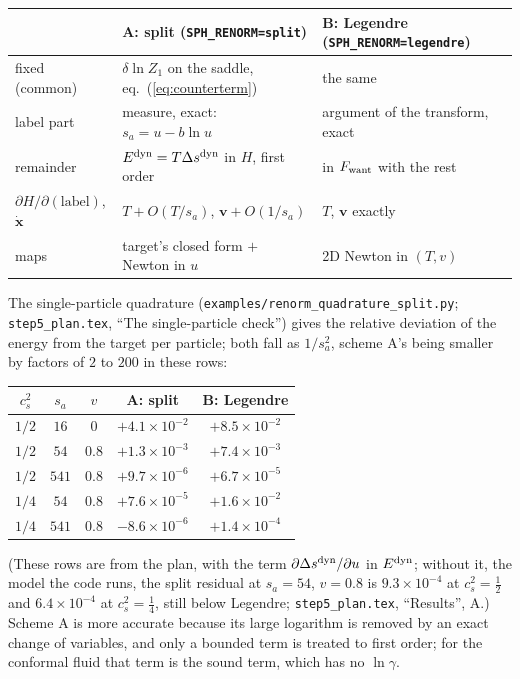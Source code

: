 \documentclass[11pt,aps,preprint,nofootinbib,superscriptaddress,tightenlines]{revtex4-2}
\def\Eq#1{eq.~(\ref{#1})}
\begin{document}
\begin{center}
\small
\begin{tabular}{lll}
\toprule
 & A: split (\texttt{SPH\_RENORM=split}) & B: Legendre (\texttt{SPH\_RENORM=legendre}) \\
\midrule
fixed (common) & $\delta\ln Z_1$ on the saddle, \Eq{eq:counterterm} & the same \\
label part & measure, exact: $s_a=u-b\ln u$ & argument of the transform, exact \\
remainder & $E^{\rm dyn}=T\Delta s^{\rm dyn}$ in $H$, first order & in $F_{\rm want}$ with the rest \\
$\partial H/\partial(\text{label})$, $\dot{\bm x}$ & $T+O(T/s_a)$, $\bm v+O(1/s_a)$ & $T$, $\bm v$ exactly \\
maps & target's closed form $+$ Newton in $u$ & 2D Newton in $(T,v)$ \\
\bottomrule
\end{tabular}
\end{center}
The single-particle quadrature (\nolinkurl{examples/renorm_quadrature_split.py}; \nolinkurl{step5_plan.tex}, ``The single-particle check'') gives the
relative deviation of the energy from the target per particle; both fall as $1/s_a^2$, scheme A's being smaller by factors of $2$ to $200$ in these rows:
\begin{center}
\small
\begin{tabular}{ccc cc}
\toprule
$c_s^2$ & $s_a$ & $v$ & A: split & B: Legendre \\
\midrule
$1/2$ & $16$ & $0$ & $+4.1\times10^{-2}$ & $+8.5\times10^{-2}$ \\
$1/2$ & $54$ & $0.8$ & $+1.3\times10^{-3}$ & $+7.4\times10^{-3}$ \\
$1/2$ & $541$ & $0.8$ & $+9.7\times10^{-6}$ & $+6.7\times10^{-5}$ \\
$1/4$ & $54$ & $0.8$ & $+7.6\times10^{-5}$ & $+1.6\times10^{-2}$ \\
$1/4$ & $541$ & $0.8$ & $-8.6\times10^{-6}$ & $+1.4\times10^{-4}$ \\
\bottomrule
\end{tabular}
\end{center}
(These rows are from the plan, with the term $\partial\Delta s^{\rm dyn}/\partial u$ in $E^{\rm dyn}$; without it, the model the code runs, the split residual
at $s_a=54$, $v=0.8$ is $9.3\times10^{-4}$ at $c_s^2=\tfrac12$ and $6.4\times10^{-4}$ at $c_s^2=\tfrac14$, still below Legendre; \nolinkurl{step5_plan.tex}, ``Results'', A.)  Scheme A is more accurate because its large logarithm is removed
by an exact change of variables, and only a bounded term is treated to first order; for the conformal fluid that term is the sound term, which has
no $\ln\gamma$.
\end{document}
